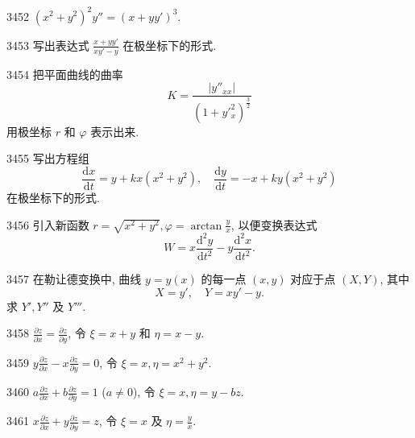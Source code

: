 \begin{prob}[S]{3452}
$(x^2+y^2)^2 y'' = (x+yy')^3$.
\end{prob}

\begin{prob}[S]{3453}
写出表达式 $\frac{x+yy'}{xy'-y}$ 在极坐标下的形式.
\end{prob}

\begin{prob}[M]{3454}
把平面曲线的曲率
\[
K = \frac{|y''_{xx}|}{(1+y'^2_x)^{\frac{3}{2}}}
\]
用极坐标 $r$ 和 $\varphi$ 表示出来.
\end{prob}

\begin{prob}[M]{3455}
写出方程组
\[
\frac{\mathrm{d}x}{\mathrm{d}t} = y + kx(x^2+y^2), \quad \frac{\mathrm{d}y}{\mathrm{d}t} = -x + ky(x^2+y^2)
\]
在极坐标下的形式.
\end{prob}

\begin{prob}[M]{3456}
引入新函数 $r = \sqrt{x^2+y^2}, \varphi = \arctan\frac{y}{x}$, 以便变换表达式
\[
W = x\frac{\mathrm{d}^2 y}{\mathrm{d}t^2} - y\frac{\mathrm{d}^2 x}{\mathrm{d}t^2}.
\]
\end{prob}

\begin{prob}[M]{3457}
在勒让德变换中, 曲线 $y=y(x)$ 的每一点 $(x, y)$ 对应于点 $(X, Y)$, 其中
\[
X = y', \quad Y = xy' - y.
\]
求 $Y', Y''$ 及 $Y'''$.
\end{prob}


\begin{prob}[S]{3458}
$\frac{\partial z}{\partial x} = \frac{\partial z}{\partial y}$, 令 $\xi = x+y$ 和 $\eta = x-y$.
\end{prob}

\begin{prob}[S]{3459}
$y\frac{\partial z}{\partial x} - x\frac{\partial z}{\partial y} = 0$, 令 $\xi = x, \eta = x^2+y^2$.
\end{prob}

\begin{prob}[S]{3460}
$a\frac{\partial z}{\partial x} + b\frac{\partial z}{\partial y} = 1$ ($a \neq 0$), 令 $\xi = x, \eta = y - bz$.
\end{prob}

\begin{prob}[S]{3461}
$x\frac{\partial z}{\partial x} + y\frac{\partial z}{\partial y} = z$, 令 $\xi = x$ 及 $\eta = \frac{y}{x}$.
\end{prob}

